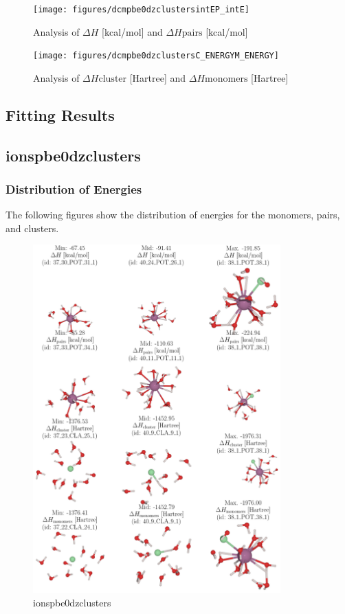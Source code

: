 \documentclass[journal=jacsat,manuscript=article]{achemso}
\begin{document}
\begin{figure}
    \centering
    \texttt{[image: figures/dcmpbe0dzclustersintEP\_intE]}
    \caption{ Analysis of $\Delta H$ [kcal/mol] and $\Delta H{\mathrm{pairs}}$ [kcal/mol] }
    \label{fig:dcmpbe0dzclusters_intE_P_intE}
\end{figure}

\begin{figure}
    \centering
    \texttt{[image: figures/dcmpbe0dzclustersC\_ENERGYM\_ENERGY]}
    \caption{ Analysis of $\Delta H{\mathrm{cluster}}$ [Hartree] and $\Delta H{\mathrm{monomers}}$ [Hartree] }
    \label{fig:dcmpbe0dzclusters_C_ENERGY_M_ENERGY}
\end{figure}
\newpage 
 \subsection{Fitting Results}
\subsection{ionspbe0dzclusters}
\subsubsection{Distribution of Energies} 
 The following figures show the distribution of energies for the monomers, pairs, and clusters.

\begin{figure}
    \centering
    \includegraphics[width=0.85\textwidth]{figures/ionspbe0dzclustersmols}
    \caption{ ionspbe0dzclusters }
    \label{fig:ionspbe0dzclustersmols}
\end{figure}
\end{document}
